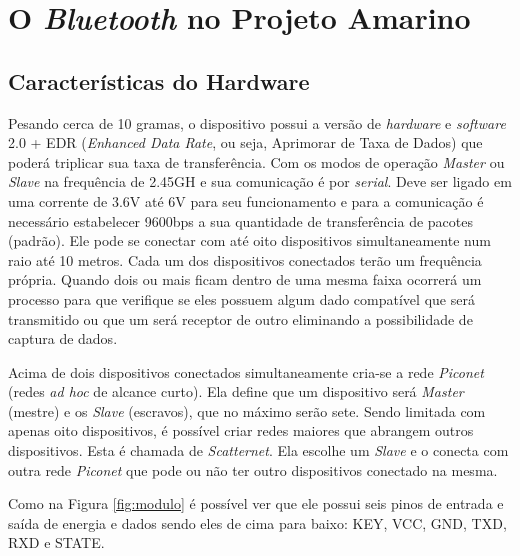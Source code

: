 \documentclass[portugues, brazil, a4paper,12pt]{article}
\begin{document}

\section{O \textit{Bluetooth} no Projeto Amarino}
\subsection{Características do Hardware}
Pesando cerca de 10 gramas, o dispositivo possui a versão de \textit{hardware} e \textit{software} 2.0 + EDR (\textit{Enhanced Data Rate}, ou seja, Aprimorar de Taxa de Dados) que poderá triplicar sua taxa de transferência. Com os modos de operação \textit{Master} ou \textit{Slave} na frequência de 2.45GH e sua comunicação é por \textit{serial}. Deve ser ligado em uma corrente de 3.6V até 6V para seu funcionamento e para a comunicação é necessário estabelecer 9600bps a sua quantidade de transferência de pacotes (padrão). Ele pode se conectar com até oito dispositivos simultaneamente num raio até 10 metros. Cada um dos dispositivos conectados terão um frequência própria. Quando dois ou mais ficam dentro de uma mesma faixa ocorrerá um processo para que verifique se eles possuem algum dado compatível que será transmitido ou que um será receptor de outro eliminando a possibilidade de captura de dados.

Acima de dois dispositivos conectados simultaneamente cria-se a rede \textit{Piconet} (redes \textit{ad hoc} de alcance curto). Ela define que um dispositivo será \textit{Master} (mestre) e os \textit{Slave} (escravos), que no máximo serão sete. Sendo limitada com apenas oito dispositivos, é possível criar redes maiores que abrangem outros dispositivos. Esta é chamada de \textit{Scatternet}. Ela escolhe um \textit{Slave} e o conecta com outra rede \textit{Piconet} que pode ou não ter outro dispositivos conectado na mesma.

Como na Figura \ref{fig:modulo} é possível ver que ele possui seis pinos de entrada e saída de energia e dados sendo eles de cima para baixo: KEY, VCC, GND, TXD, RXD e STATE.
\end{document}
